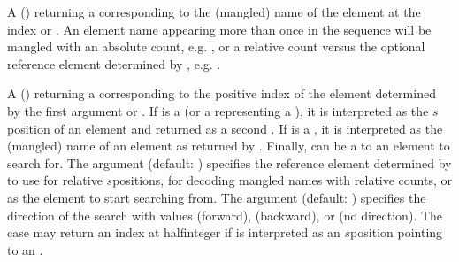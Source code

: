 \documentclass[letterpaper,10pt,english]{sphinxmanual}
\begin{document}
\begin{description}
\sphinxAtStartPar
A  () returning a  corresponding to the (mangled) name of the element at the index  or . An element
name appearing more than once in the sequence will be mangled with an absolute count, e.g. , or a relative count versus the optional
reference element  determined by , e.g. .

\sphinxAtStartPar
A  () returning a  corresponding to the positive index of the element determined by the first argument or .
If  is a  (or a  representing a ), it is interpreted as the \(s\)\sphinxhyphen{}position of an element and returned as a second
. If  is a , it is interpreted as the (mangled) name of an element as returned by . Finally,  can be a 
to an element to search for. The argument  (default: ) specifies the reference element determined by  to use for
relative \(s\)\sphinxhyphen{}positions, for decoding mangled names with relative counts, or as the element to start searching from. The argument 
(default: ) specifies the direction of the search with values  (forward),  (backward), or  (no direction). The 
case may return an index at half\sphinxhyphen{}integer if  is interpreted as an \(s\)\sphinxhyphen{}position pointing to an .


\end{description}
\end{document}
